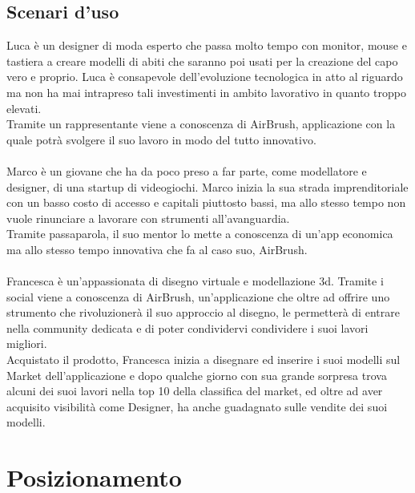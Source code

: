 \documentclass[11pt,fleqn]{book} %
\begin{document}
\section{Scenari d'uso}
Luca è un designer di moda esperto che passa molto tempo con monitor, mouse e tastiera a creare modelli di abiti che saranno poi usati per la creazione del capo vero e proprio. Luca è consapevole dell'evoluzione tecnologica in atto al riguardo ma non ha mai intrapreso tali investimenti in ambito lavorativo in quanto troppo elevati. \\
Tramite un rappresentante viene a conoscenza di AirBrush, applicazione con la quale potrà svolgere il suo lavoro in modo del tutto innovativo.
\\\\
Marco è un giovane che ha da poco preso a far parte, come modellatore e designer, di una startup di videogiochi.
Marco inizia la sua strada imprenditoriale con un basso costo di accesso e capitali piuttosto bassi, ma allo stesso tempo non vuole rinunciare a lavorare con strumenti all'avanguardia. \\
Tramite passaparola, il suo mentor lo mette a conoscenza di un'app economica ma allo stesso tempo innovativa che fa al caso suo, AirBrush.
\\\\
Francesca è un'appassionata di disegno virtuale e modellazione 3d. Tramite i social viene a conoscenza di AirBrush, un'applicazione che oltre ad offrire uno strumento che rivoluzionerà il suo approccio al disegno, le permetterà di entrare nella community dedicata e di poter condividervi condividere i suoi lavori migliori. \\Acquistato il prodotto, Francesca inizia a disegnare ed inserire i suoi modelli sul Market dell'applicazione e dopo qualche giorno con sua grande sorpresa trova alcuni dei suoi lavori nella top 10 della classifica del market, ed oltre ad aver acquisito visibilità come Designer, ha anche guadagnato sulle vendite dei suoi modelli.






\chapter{Posizionamento}
\end{document}
